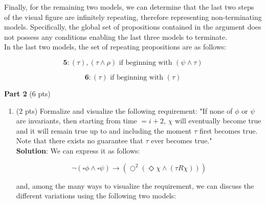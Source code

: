 \documentclass[12pt]{article}
\begin{document}
\begin{spacing}{1.5}
\begin{enumerate}
		      Finally, for the remaining two models, we can determine that the last two steps of the visual figure are infinitely repeating, therefore representing non-terminating models. Specifically, the global set of propositions contained in the argument does not possess any conditions enabling the last three models to terminate.\\
		      		      		      		      		      		      
		      In the last two models, the set of repeating propositions are as follows:
		      		      		      		      		      		      
		      $$\textbf{5}: (\tau), (\tau \land \rho) \text{ if beginning with } (\psi \land \tau)$$
		      		      		      		      		      		      
		      $$\textbf{6}: (\tau) \text{ if beginning with } (\tau)$$
		      		      		      		      		      		      		              
	\end{enumerate}
						
	\textbf{Part 2} (6 pts)
						
	\begin{enumerate}
		\item (2 pts) Formalize and visualize the following requirement: "If none of $\phi$ or $\psi$ are invariants, then starting from time $=i+2$, $\chi$ will eventually become true and it will remain true up to and including the moment $\tau$ first becomes true. Note that there exists no guarantee that $\tau$ ever becomes true."\\
		      		      		      		      		      		      
		      \textbf{Solution}: We can express it as follows:
		      		      		      		      		      		      
		      $$\neg(\square \phi \land \square \psi)\rightarrow (\bigcirc^2 (\Diamond \chi \land (\tau R \chi)))$$
		      		      		      		      		      		      
		      and, among the many ways to visualize the requirement, we can discuss the different variations using the following two models:
		      		      		      		      		      		              
		      \begin{center}
\end{center}
\end{enumerate}
\end{spacing}
\end{document}
